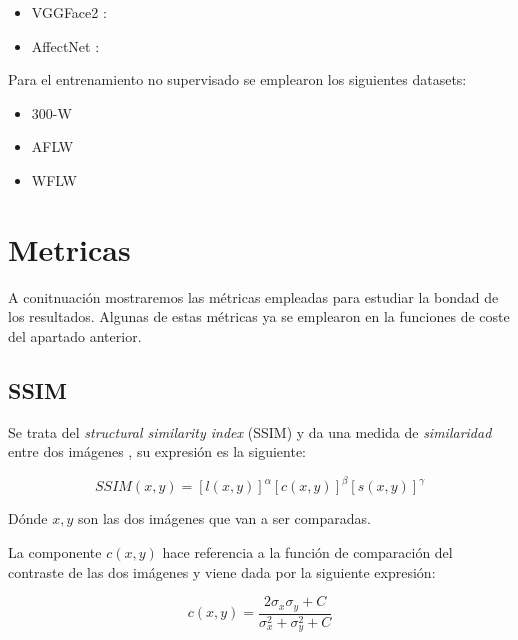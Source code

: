                 \begin{itemize}
                    \item VGGFace2 :
                    \item AffectNet :
                \end{itemize}

                \noindent Para el entrenamiento no supervisado se emplearon los siguientes datasets: 
                
                \begin{itemize}
                    \item 300-W
                    \item AFLW
                    \item WFLW
                \end{itemize}

    \section{Metricas}
        
        \noindent A conitnuación mostraremos las métricas empleadas para estudiar la bondad de los resultados. Algunas de estas métricas ya se emplearon en la funciones de coste del apartado anterior. 

        \subsection{SSIM}
            \noindent Se trata del \textit{structural similarity index} (SSIM) y da una medida de \textit{similaridad} entre dos imágenes \cite{wang2004image}, su expresión es la siguiente: 

            \begin{equation}
                SSIM(x,y)=[l(x,y)]^\alpha[c(x,y)]^{\beta}[s(x,y)]^{\gamma}
            \end{equation}

            \medskip

            \noindent Dónde $x,y$ son las dos imágenes que van a ser comparadas.

            \medskip

            \noindent La componente $c(x,y)$ hace referencia a la función de comparación del contraste de las dos imágenes y viene dada por la siguiente expresión: 

            \begin{equation}
                c(x,y)=\frac{2\sigma_x \sigma_y + C}{\sigma_x^2+ \sigma_y^2+C}
            \end{equation}


